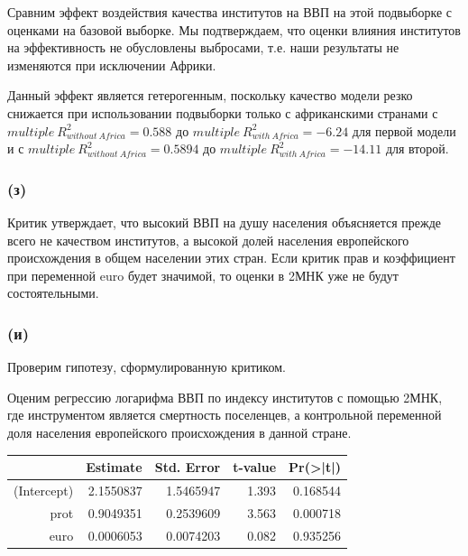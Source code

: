 \documentclass[a4paper,12pt]{article} %
\begin{document}
Сравним эффект воздействия качества институтов на ВВП на этой
подвыборке с оценками на базовой выборке. 
Мы подтверждаем, что оценки влияния институтов на эффективность не обусловлены выбросами, т.е. наши результаты  не изменяются при  исключении Африки. 

Данный эффект является гетерогенным, поскольку качество модели резко снижается при использовании подвыборки только с африканскими странами с $ multiple \ R^2_{without \ Africa} = 0.588   $ до $ multiple \ R^2_{with \ Africa} = -6.24  $  для первой модели и с $ multiple \ R^2_{without \ Africa} = 0.5894   $  до $ multiple \ R^2_{with \ Africa} = -14.11   $  для второй.   
	
\subsubsection*{(з)}	

Критик утверждает, что высокий ВВП на душу
населения 
объясняется прежде всего не качеством институтов, а высокой долей
населения европейского происхождения в общем населении этих стран.
Если критик прав и коэффициент при переменной euro будет значимой, то оценки в 2МНК уже не будут  состоятельными.
  


\subsubsection*{(и)}	

Проверим гипотезу, сформулированную критиком. 



Оценим регрессию логарифма ВВП по индексу институтов с помощью 2МНК, где инструментом является смертность  поселенцев, а контрольной переменной доля населения европейского происхождения в данной
стране.

\begin{table}[h!]
	\centering
	\begin{tabular}{rrrrr}
		\hline
		& Estimate & Std. Error & t-value & Pr(>|t|) \\ 
		\hline
		(Intercept) & 2.1550837 &  1.5465947 &  1.393& 0.168544    \\ 
		prot &  0.9049351 & 0.2539609 &  3.563& 0.000718 \\ 
		euro  &      0.0006053 & 0.0074203 &  0.082 &0.935256  
		 
		\\ 
		\hline
	\end{tabular}
\end{table}	
\end{document}
